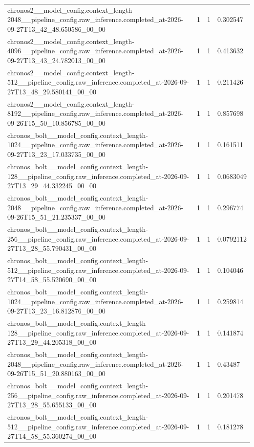 \begin{tabular}{llll}
chronos2\_\_model\_config.context\_length-2048\_\_pipeline\_config.raw\_inference.completed\_at-2026-09-27T13\_42\_48.650586\_00\_00 & 1 & 1 & 0.302547 \\
chronos2\_\_model\_config.context\_length-4096\_\_pipeline\_config.raw\_inference.completed\_at-2026-09-27T13\_43\_24.782013\_00\_00 & 1 & 1 & 0.413632 \\
chronos2\_\_model\_config.context\_length-512\_\_pipeline\_config.raw\_inference.completed\_at-2026-09-27T13\_48\_29.580141\_00\_00 & 1 & 1 & 0.211426 \\
chronos2\_\_model\_config.context\_length-8192\_\_pipeline\_config.raw\_inference.completed\_at-2026-09-26T15\_50\_10.856785\_00\_00 & 1 & 1 & 0.857698 \\
chronos\_bolt\_\_model\_config.context\_length-1024\_\_pipeline\_config.raw\_inference.completed\_at-2026-09-27T13\_23\_17.033735\_00\_00 & 1 & 1 & 0.161511 \\
chronos\_bolt\_\_model\_config.context\_length-128\_\_pipeline\_config.raw\_inference.completed\_at-2026-09-27T13\_29\_44.332245\_00\_00 & 1 & 1 & 0.0683049 \\
chronos\_bolt\_\_model\_config.context\_length-2048\_\_pipeline\_config.raw\_inference.completed\_at-2026-09-26T15\_51\_21.235337\_00\_00 & 1 & 1 & 0.296774 \\
chronos\_bolt\_\_model\_config.context\_length-256\_\_pipeline\_config.raw\_inference.completed\_at-2026-09-27T13\_28\_55.790431\_00\_00 & 1 & 1 & 0.0792112 \\
chronos\_bolt\_\_model\_config.context\_length-512\_\_pipeline\_config.raw\_inference.completed\_at-2026-09-27T14\_58\_55.520690\_00\_00 & 1 & 1 & 0.104046 \\
chronos\_bolt\_\_model\_config.context\_length-1024\_\_pipeline\_config.raw\_inference.completed\_at-2026-09-27T13\_23\_16.812876\_00\_00 & 1 & 1 & 0.259814 \\
chronos\_bolt\_\_model\_config.context\_length-128\_\_pipeline\_config.raw\_inference.completed\_at-2026-09-27T13\_29\_44.205318\_00\_00 & 1 & 1 & 0.141874 \\
chronos\_bolt\_\_model\_config.context\_length-2048\_\_pipeline\_config.raw\_inference.completed\_at-2026-09-26T15\_51\_20.880163\_00\_00 & 1 & 1 & 0.43487 \\
chronos\_bolt\_\_model\_config.context\_length-256\_\_pipeline\_config.raw\_inference.completed\_at-2026-09-27T13\_28\_55.655133\_00\_00 & 1 & 1 & 0.201478 \\
chronos\_bolt\_\_model\_config.context\_length-512\_\_pipeline\_config.raw\_inference.completed\_at-2026-09-27T14\_58\_55.360274\_00\_00 & 1 & 1 & 0.181278 \\

\end{tabular}
